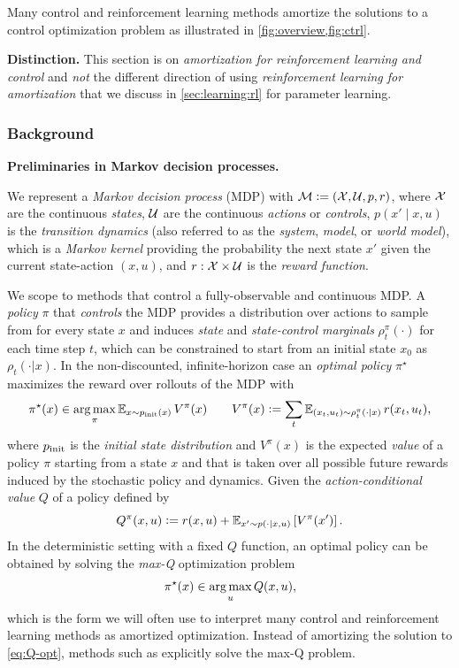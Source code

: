 \documentclass[twoside,11pt]{article}
\begin{document}
Many control and reinforcement learning methods amortize the
solutions to a control optimization problem as illustrated in
\cref{fig:overview,fig:ctrl}.

\textbf{Distinction.} This section is on \emph{amortization for
reinforcement learning and control} and \emph{not} the
different direction of using \emph{reinforcement learning
for amortization} that we discuss in
\cref{sec:learning:rl} for parameter learning.

\subsubsection{Background}
\textbf{Preliminaries in Markov decision processes.}
\begin{definition}
  We represent a \emph{Markov decision process} (MDP) with
  ${\mathcal{M}}\vcentcolon=({\mathcal{X}}, {\mathcal{U}}, p, r)$,
  where ${\mathcal{X}}$ are the continuous \emph{states},
  ${\mathcal{U}}$ are the continuous \emph{actions} or \emph{controls},
  $p(x' \mid x, u)$ is the \emph{transition dynamics}
  (also referred to as the \emph{system}, \emph{model},
  or \emph{world model}),
  which is a \emph{Markov kernel} providing
  the probability the next state $x'$
  given the current state-action $(x, u)$,
  and $r: {\mathcal{X}}\times{\mathcal{U}}$ is the \emph{reward function}.
\end{definition}
We scope to methods that control a
fully-observable and continuous MDP.
A \emph{policy} $\pi$ that \emph{controls}
the MDP provides a distribution over actions to sample from
for every state $x$ and induces \emph{state} and
\emph{state-control marginals} $\rho_t^\pi(\cdot)$ for each
time step $t$, which can be constrained to start from an initial
state $x_0$ as $\rho_t(\cdot|x)$.
In the non-discounted, infinite-horizon case
an \emph{optimal policy} $\pi^\star$ maximizes the reward over
rollouts of the MDP with
\begin{equation}
  \pi^\star(x)\in \operatorname*{arg\,max}_\pi \operatorname{\mathbb{E}}_{x\sim p_{\rm init}(x)} V^\pi(x)
  \qquad
  V^\pi(x)\vcentcolon= \sum_t \operatorname{\mathbb{E}}_{(x_t, u_t)\sim\rho_t^\pi(\cdot\mid x)} r(x_t, u_t),
  \label{eq:pistar}
\end{equation}
where $p_{\rm init}$ is the \emph{initial state distribution}
and $V^\pi(x)$ is the expected \emph{value} of a policy $\pi$
starting from a state $x$ and that is taken over all possible
future rewards induced by the stochastic policy and dynamics.
Given the \emph{action-conditional value} $Q$ of a policy
defined by
\begin{equation}
  Q^\pi(x, u)\vcentcolon= r(x, u) + \operatorname{\mathbb{E}}_{x'\sim p(\cdot|x,u)}\left[V^\pi(x')\right].
  \label{eq:Q}
\end{equation}
In the deterministic setting with a fixed $Q$ function,
an optimal policy can be obtained by solving the
\emph{max-Q} optimization problem
\begin{equation}
  \pi^\star(x) \in \operatorname*{arg\,max}_u Q(x, u),
  \label{eq:Q-opt}
\end{equation}
which is the form we will often use to interpret many
control and reinforcement learning methods
as amortized optimization.
Instead of amortizing the solution to \cref{eq:Q-opt},
methods such as \citet{lowrey2018plan,ryu2019caql}
explicitly solve the max-Q problem.
\end{document}
